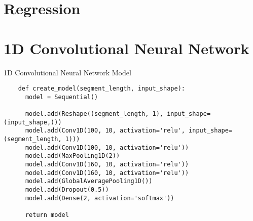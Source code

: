 \section{Regression}

\section{1D Convolutional Neural Network}

\begin{code}
  \caption{1D Convolutional Neural Network Model}
  \label{code:1d_conv_net}
  
  \begin{verbatim}
    def create_model(segment_length, input_shape):
      model = Sequential()

      model.add(Reshape((segment_length, 1), input_shape=(input_shape,)))
      model.add(Conv1D(100, 10, activation='relu', input_shape=(segment_length, 1)))
      model.add(Conv1D(100, 10, activation='relu'))
      model.add(MaxPooling1D(2))
      model.add(Conv1D(160, 10, activation='relu'))
      model.add(Conv1D(160, 10, activation='relu'))
      model.add(GlobalAveragePooling1D())
      model.add(Dropout(0.5))
      model.add(Dense(2, activation='softmax'))

      return model
  \end{verbatim}
\end{code}

